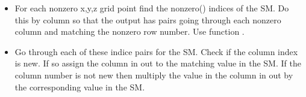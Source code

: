 \documentclass[letterpaper,10pt,english]{sphinxmanual}
\begin{document}
\begin{fulllineitems}
\begin{fulllineitems}
\begin{description}
\begin{itemize}
\item {} 
For each nonzero x,y,z grid point find the       nonzero() indices of the SM. Do this by column so       that the output has pairs going through       each nonzero column and matching the nonzero row       number. Use function {\hyperref[index:DictionarySparseMatrix.nonzero_bycol]{}}.

\item {} 
Go through each of these indice pairs for the SM.       Check if the column index is new. If so assign       the column in out to the matching       value in the SM. If the column number is not       new then multiply the value in the column in       out by the corresponding value in the SM.

\end{itemize}

\end{description}


\end{fulllineitems}
\end{fulllineitems}
\end{document}
